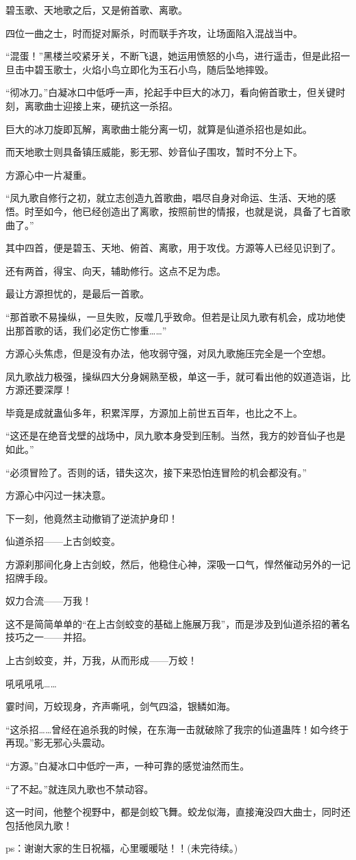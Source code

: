 \begin{this_body}
碧玉歌、天地歌之后，又是俯首歌、离歌。

四位一曲之士，时而捉对厮杀，时而联手齐攻，让场面陷入混战当中。

“混蛋！”黑楼兰咬紧牙关，不断飞退，她运用愤怒的小鸟，进行遥击，但是此招一旦击中碧玉歌士，火焰小鸟立即化为玉石小鸟，随后坠地摔毁。

“彻冰刀。”白凝冰口中低呼一声，抡起手中巨大的冰刀，看向俯首歌士，但关键时刻，离歌曲士迎接上来，硬抗这一杀招。

巨大的冰刀旋即瓦解，离歌曲士能分离一切，就算是仙道杀招也是如此。

而天地歌士则具备镇压威能，影无邪、妙音仙子围攻，暂时不分上下。

方源心中一片凝重。

“凤九歌自修行之初，就立志创造九首歌曲，唱尽自身对命运、生活、天地的感悟。时至如今，他已经创造出了离歌，按照前世的情报，也就是说，具备了七首歌曲了。”

其中四首，便是碧玉、天地、俯首、离歌，用于攻伐。方源等人已经见识到了。

还有两首，得宝、向天，辅助修行。这点不足为虑。

最让方源担忧的，是最后一首歌。

“那首歌不易操纵，一旦失败，反噬几乎致命。但若是让凤九歌有机会，成功地使出那首歌的话，我们必定伤亡惨重……”

方源心头焦虑，但是没有办法，他攻弱守强，对凤九歌施压完全是一个空想。

凤九歌战力极强，操纵四大分身娴熟至极，单这一手，就可看出他的奴道造诣，比方源还要深厚！

毕竟是成就蛊仙多年，积累浑厚，方源加上前世五百年，也比之不上。

“这还是在绝音戈壁的战场中，凤九歌本身受到压制。当然，我方的妙音仙子也是如此。”

“必须冒险了。否则的话，错失这次，接下来恐怕连冒险的机会都没有。”

方源心中闪过一抹决意。

下一刻，他竟然主动撤销了逆流护身印！

仙道杀招——上古剑蛟变。

方源刹那间化身上古剑蛟，然后，他稳住心神，深吸一口气，悍然催动另外的一记招牌手段。

奴力合流——万我！

这不是简简单单的“在上古剑蛟变的基础上施展万我”，而是涉及到仙道杀招的著名技巧之一——并招。

上古剑蛟变，并，万我，从而形成——万蛟！

吼吼吼吼……

霎时间，万蛟现身，齐声嘶吼，剑气四溢，银鳞如海。

“这杀招……曾经在追杀我的时候，在东海一击就破除了我宗的仙道蛊阵！如今终于再现。”影无邪心头震动。

“方源。”白凝冰口中低咛一声，一种可靠的感觉油然而生。

“了不起。”就连凤九歌也不禁动容。

这一时间，他整个视野中，都是剑蛟飞舞。蛟龙似海，直接淹没四大曲士，同时还包括他凤九歌！

ps：谢谢大家的生日祝福，心里暖暖哒！！(未完待续。)

\end{this_body}

